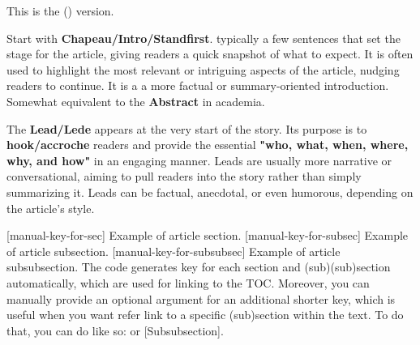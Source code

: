 
This is the \textcolor{myColorWarning}{\textbf{\myLanguageLong} (\myLanguage)} version.\\


Start with \textcolor{myColorSuccess}{\textbf{Chapeau/Intro/Standfirst}}. typically a few sentences that set the stage for the article, giving readers a quick snapshot of what to expect. It is often used to highlight the most relevant or intriguing aspects of the article, nudging readers to continue. It is a  a more factual or summary-oriented introduction. Somewhat equivalent to the \textcolor{myColorSuccess}{\textbf{Abstract}} in academia.


The \textcolor{myColorSuccess}{\textbf{Lead/Lede}} appears at the very start of the story. Its purpose is to \textcolor{myColorSuccess}{\textbf{hook/accroche}} readers and provide the essential \textbf{"who, what, when, where, why, and how"} in an engaging manner. Leads are usually more narrative or conversational, aiming to pull readers into the story rather than simply summarizing it. Leads can be factual, anecdotal, or even humorous, depending on the article's style.


[manual-key-for-sec]
Example of article section.
[manual-key-for-subsec]
Example of article subsection.
[manual-key-for-subsubsec]
Example of article subsubsection.
The code generates key for each section and (sub)(sub)section automatically, which are used for linking to the TOC.
Moreover, you can manually provide an optional argument for an additional shorter key, which is useful when you want refer link to a specific (sub)section within the text. To do that, you can do like so: or [Subsubsection].

